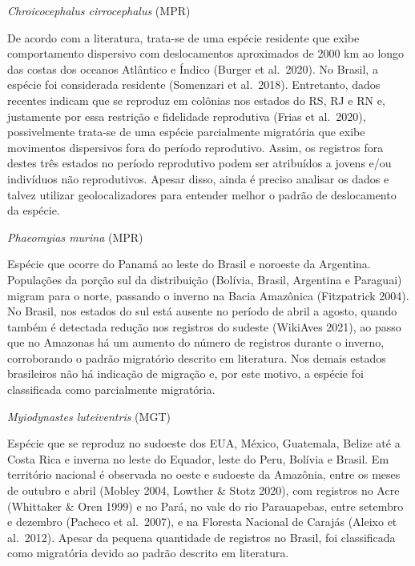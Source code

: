 \documentclass[
  oneside]{scrbook}
\begin{document}
\begin{blackbox}
\emph{Chroicocephalus cirrocephalus} (MPR)

De acordo com a literatura, trata-se de uma espécie residente que exibe comportamento dispersivo com deslocamentos aproximados de 2000 km ao longo das costas dos oceanos Atlântico e Índico (Burger et al.~2020). No Brasil, a espécie foi considerada residente (Somenzari et al.~2018). Entretanto, dados recentes indicam que se reproduz em colônias nos estados do RS, RJ e RN e, justamente por essa restrição e fidelidade reprodutiva (Frias et al.~2020), possivelmente trata-se de uma espécie parcialmente migratória que exibe movimentos dispersivos fora do período reprodutivo. Assim, os registros fora destes três estados no período reprodutivo podem ser atribuídos a jovens e/ou indivíduos não reprodutivos. Apesar disso, ainda é preciso analisar os dados e talvez utilizar geolocalizadores para entender melhor o padrão de deslocamento da espécie.

\end{blackbox}

\begin{blackbox}
\emph{Phaeomyias murina} (MPR)

Espécie que ocorre do Panamá ao leste do Brasil e noroeste da Argentina. Populações da porção sul da distribuição (Bolívia, Brasil, Argentina e Paraguai) migram para o norte, passando o inverno na Bacia Amazônica (Fitzpatrick 2004). No Brasil, nos estados do sul está ausente no período de abril a agosto, quando também é detectada redução nos registros do sudeste (WikiAves 2021), ao passo que no Amazonas há um aumento do número de registros durante o inverno, corroborando o padrão migratório descrito em literatura. Nos demais estados brasileiros não há indicação de migração e, por este motivo, a espécie foi classificada como parcialmente migratória.

\end{blackbox}

\begin{blackbox}
\emph{Myiodynastes luteiventris} (MGT)

Espécie que se reproduz no sudoeste dos EUA, México, Guatemala, Belize até a Costa Rica e inverna no leste do Equador, leste do Peru, Bolívia e Brasil. Em território nacional é observada no oeste e sudoeste da Amazônia, entre os meses de outubro e abril (Mobley 2004, Lowther \& Stotz 2020), com registros no Acre (Whittaker \& Oren 1999) e no Pará, no vale do rio Parauapebas, entre setembro e dezembro (Pacheco et al.~2007), e na Floresta Nacional de Carajás (Aleixo et al.~2012). Apesar da pequena quantidade de registros no Brasil, foi classificada como migratória devido ao padrão descrito em literatura.

\end{blackbox}
\end{document}
